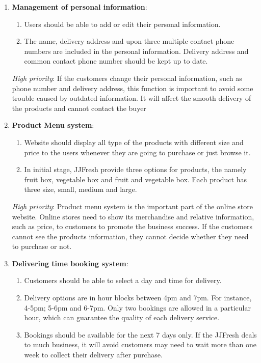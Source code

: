 \documentclass{report}
\begin{document}
\begin{enumerate}
  \item \textbf{Management of personal information}:
  \begin{enumerate}
    \item Users should be able to add or edit their personal information.
    \item The name, delivery address and upon three multiple contact phone numbers are included in the personal information. Delivery address and common contact phone number should be kept up to date.
  \end{enumerate}

  \textit{High priority}: If the customers change their personal information, such as phone number and delivery address, this function is important to avoid some trouble caused by outdated information. It will affect the smooth delivery of the products and cannot contact the buyer

  \item \textbf{Product Menu system}:
  \begin{enumerate}
    \item Website should display all type of the products with different size and price to the users whenever they are going to purchase or just browse it.
    \item In initial stage, JJFresh provide three options for products, the namely fruit box, vegetable box and fruit and vegetable box. Each product has three size, small, medium and large.
  \end{enumerate}

  \textit{High priority}: Product menu system is the important part of the online store website. Online stores need to show its merchandise and relative information, such as price, to customers to promote the business success. If the customers cannot see the products information, they cannot decide whether they need to purchase or not.

  \item \textbf{Delivering time booking system}:  
  \begin{enumerate}
    \item Customers should be able to select a day and time for delivery.
    \item Delivery options are in hour blocks between 4pm and 7pm. For instance, 4-5pm; 5-6pm and 6-7pm. Only two bookings are allowed in a particular hour, which can guarantee the quality of each delivery service. 
    \item Bookings should be available for the next 7 days only. If the JJFresh deals to much business, it will avoid customers may need to wait more than one week to collect their delivery after purchase.
  \end{enumerate}


\end{enumerate}
\end{document}
